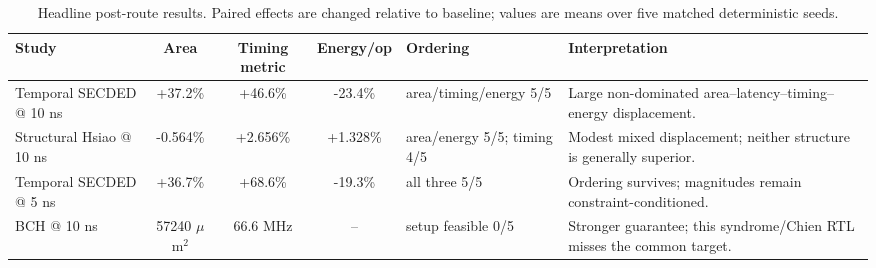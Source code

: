 \begin{table}[t]
\caption{Headline post-route results. Paired effects are changed relative to baseline; values are means over five matched deterministic seeds.}
\label{tab:headline}
\centering\scriptsize\setlength{\tabcolsep}{3.1pt}
\begin{tabular}{@{}lccclp{5.0cm}@{}}
\toprule
Study & Area & Timing metric & Energy/op & Ordering & Interpretation \\
\midrule
Temporal SECDED @ 10 ns & +37.2\% & +46.6\% & -23.4\% & area/timing/energy 5/5 & Large non-dominated area--latency--timing--energy displacement. \\
Structural Hsiao @ 10 ns & -0.564\% & +2.656\% & +1.328\% & area/energy 5/5; timing 4/5 & Modest mixed displacement; neither structure is generally superior. \\
Temporal SECDED @ 5 ns & +36.7\% & +68.6\% & -19.3\% & all three 5/5 & Ordering survives; magnitudes remain constraint-conditioned. \\
BCH @ 10 ns & 57240 $\mu$m$^2$ & 66.6 MHz & -- & setup feasible 0/5 & Stronger guarantee; this syndrome/Chien RTL misses the common target. \\
\bottomrule
\end{tabular}
\end{table}
